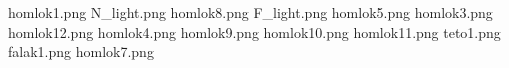 homlok1.png
N_light.png
homlok8.png
F_light.png
homlok5.png
homlok3.png
homlok12.png
homlok4.png
homlok9.png
homlok10.png
homlok11.png
teto1.png
falak1.png
homlok7.png
